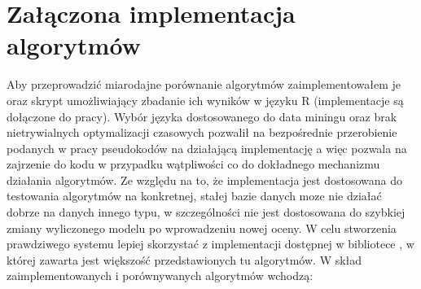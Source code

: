 \documentclass{pracamgr}
\begin{document}
  \section{Załączona implementacja algorytmów}%
   Aby przeprowadzić miarodajne porównanie algorytmów zaimplementowałem je oraz skrypt umożliwiający zbadanie ich wyników w języku R
   (implementacje są dołączone do pracy).
   Wybór języka dostosowanego do data miningu oraz brak nietrywialnych optymalizacji czasowych pozwalił na bezpośrednie przerobienie
   podanych w pracy pseudokodów na działającą implementację a więc pozwala na zajrzenie do kodu w przypadku wątpliwości co do dokładnego
   mechanizmu działania algorytmów.
   Ze względu na to, że implementacja jest dostosowana do testowania algorytmów na konkretnej, stałej bazie danych moze nie działać dobrze
   na danych innego typu, w szczególności nie jest dostosowana do szybkiej zmiany wyliczonego modelu po wprowadzeniu nowej oceny.
   W celu stworzenia prawdziwego systemu lepiej skorzystać z implementacji dostępnej w bibliotece \cite{MML}, w której zawarta jest
   większość przedstawionych tu algorytmów.\newline
   W skład zaimplementowanych i porównywanych algorytmów wchodzą:
\end{document}
